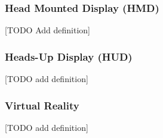 %
%
%
%
%
%
%
%	
%	
%	
%
%
%
%
%
%
%
%


\subsubsection{Head Mounted Display (HMD)}
\label{subsubsec:hmd}
[TODO Add definition]

\subsubsection{Heads-Up Display (HUD)}
\label{subsubsec:hud}
[TODO add definition]

\subsubsection{Virtual Reality}
\label{subsubsec:vr}
[TODO add definition]

